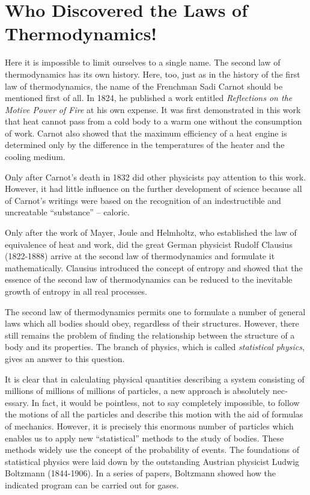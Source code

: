 \section{Who Discovered the Laws of Thermodynamics!}
Here it is impossible to limit ourselves to a single name. The second law of thermodynamics has its own history. Here, too, just as in the history of the first law of thermodynamics, the name of the Frenchman Sadi Carnot should be mentioned first of all. In 1824, he pub­lished a work entitled \emph{Reflections on the Motive Power of Fire} at his own expense. It was first demonstrated in this work that heat cannot pass from a cold body to a warm one without the consumption of work. Carnot also showed that the maximum efficiency of a heat engine is determined only by the difference in the temperatures of the heater and the cooling medium.

Only after Carnot’s death in 1832 did other physicists pay attention to this work. However, it had little influ­ence on the further development of science because all of Carnot’s writings were based on the recognition of an indestructible and uncreatable ``substance'' -- caloric.

Only after the work of Mayer, Joule and Helmholtz, who established the law of equivalence of heat and work, did the great German physicist Rudolf Clausius (1822-1888) arrive at the second law of thermodynamics and formulate it mathematically. Clausius introduced the concept of entropy and showed that the essence of the second law of thermodynamics can be reduced to the inevitable growth of entropy in all real processes.

The second law of thermodynamics permits one to for­mulate a number of general laws which all bodies should obey, regardless of their structures. However, there still remains the problem of finding the relationship between the structure of a body and its properties. The branch of physics, which is called \emph{statistical physics}, gives an answer to this question.

It is clear that in calculating physical quantities describing a system consisting of millions of millions of millions of particles, a new approach is absolutely nec­essary. In fact, it would be pointless, not to say complete­ly impossible, to follow the motions of all the particles and describe this motion with the aid of formulas of me­chanics. However, it is precisely this enormous number of particles which enables us to apply new ``statistical'' methods to the study of bodies. These methods widely use the concept of the probability of events. The founda­tions of statistical physics were laid down by the outstand­ing Austrian physicist Ludwig Boltzmann (1844-1906). In a series of papers, Boltzmann showed how the indicated program can be carried out for gases.

